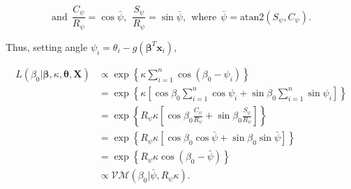 \documentclass[12pt,a4paper]{article}\usepackage[]{graphicx}\usepackage[]{color}
\begin{document}
$$ \text{and} ~~ \frac{C_{\psi}}{R_{\psi}} = \cos \bar\psi, ~~ \frac{S_{\psi}}{R_{\psi}} = \sin \bar\psi, ~~ \text{where} ~~ \bar\psi = \text{atan2}(S_{\psi}, C_{\psi}). $$

Thus, setting angle $\psi_i = \theta_i - g(\boldsymbol\beta^T \boldsymbol{x}_i)$,


\begin{align*}
L(\beta_0 \vert \boldsymbol\beta, \kappa, \boldsymbol\theta, \boldsymbol{X}) & \propto \exp \left\lbrace \kappa \sum_{i=1}^n \cos ( \beta_0 - \psi_i)  \right\rbrace \\
& = \exp \left\lbrace \kappa   \left[ \cos\beta_0 \sum_{i=1}^n \cos\psi_i +  \sin\beta_0 \sum_{i=1}^n \sin\psi_i \right]  \right\rbrace \\
& = \exp \left\lbrace R_{\psi}  \kappa  \left[ \cos\beta_0 \frac{C_{\psi}}{R_{\psi}} +  \sin\beta_0 \frac{S_{\psi}}{R_{\psi}} \right]  \right\rbrace \\
& = \exp \left\lbrace R_{\psi} \kappa   \left[ \cos\beta_0 \cos{\bar\psi} +  \sin\beta_0 \sin{\bar\psi}\right]  \right\rbrace \\
& = \exp \left\lbrace R_{\psi} \kappa \cos \left( \beta_0 - \bar\psi \right)  \right\rbrace \\
& \propto \mathcal{VM}(\beta_0 \vert \bar\psi, R_{\psi} \kappa).
\end{align*}







\end{document}

